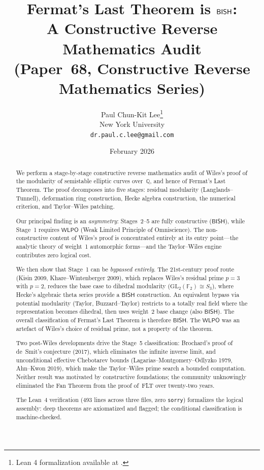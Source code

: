 \documentclass[11pt]{article}
\title{Fermat's Last Theorem is $\BISH$:\\
  A Constructive Reverse Mathematics Audit\\[6pt]
  {\large (Paper~68, Constructive Reverse Mathematics Series)}}
\author{Paul Chun-Kit Lee\thanks{Lean 4 formalization available at \leanRepo.} \\
New York University \\
\texttt{dr.paul.c.lee@gmail.com}}
\date{February 2026}
\theoremstyle{plain}
\theoremstyle{definition}
\theoremstyle{remark}
\newcommand{\Q}{\mathbb{Q}}
\newcommand{\F}{\mathbb{F}}
\newcommand{\GL}{\mathrm{GL}}
\newcommand{\BISH}{\mathsf{BISH}}
\newcommand{\WLPO}{\mathsf{WLPO}}
\begin{document}
\maketitle

\begin{abstract}

We perform a stage-by-stage constructive reverse mathematics
audit of Wiles's proof of the modularity of semistable elliptic
curves over~$\Q$, and hence of Fermat's Last Theorem.  The proof
decomposes into five stages: residual modularity
(Langlands--Tunnell), deformation ring construction, Hecke algebra
construction, the numerical criterion, and Taylor--Wiles patching.

Our principal finding is an \emph{asymmetry}: Stages~2--5 are
fully constructive ($\BISH$), while Stage~1 requires $\WLPO$
(Weak Limited Principle of Omniscience).  The non-constructive
content of Wiles's proof is concentrated entirely at its entry
point---the analytic theory of weight~1 automorphic forms---and
the Taylor--Wiles engine contributes zero logical cost.

We then show that Stage~1 can be \emph{bypassed entirely}.
The 21st-century proof route (Kisin 2009, Khare--Wintenberger
2009), which replaces Wiles's residual prime $p = 3$ with
$p = 2$, reduces the base case to dihedral modularity
($\GL_2(\F_2) \cong S_3$), where Hecke's algebraic theta series
provide a $\BISH$ construction.  An equivalent bypass via
potential modularity (Taylor, Buzzard--Taylor) restricts
to a totally real field where the representation becomes dihedral,
then uses weight~2 base change (also $\BISH$).
The overall classification of Fermat's Last Theorem is therefore
$\BISH$.  The $\WLPO$ was an artefact of Wiles's
choice of residual prime, not a property of the theorem.

Two post-Wiles developments drive the Stage~5 classification:
Brochard's proof of de~Smit's conjecture (2017), which eliminates
the infinite inverse limit, and unconditional effective Chebotarev
bounds (Lagarias--Montgomery--Odlyzko 1979, Ahn--Kwon 2019), which
make the Taylor--Wiles prime search a bounded computation.  Neither
result was motivated by constructive foundations; the community
unknowingly eliminated the Fan Theorem from the proof of~FLT
over twenty-two years.

The Lean~4 verification (493 lines across three files,
zero \texttt{sorry}) formalizes the logical
assembly: deep theorems are axiomatized and flagged; the
conditional classification is machine-checked.

\end{abstract}
\end{document}

